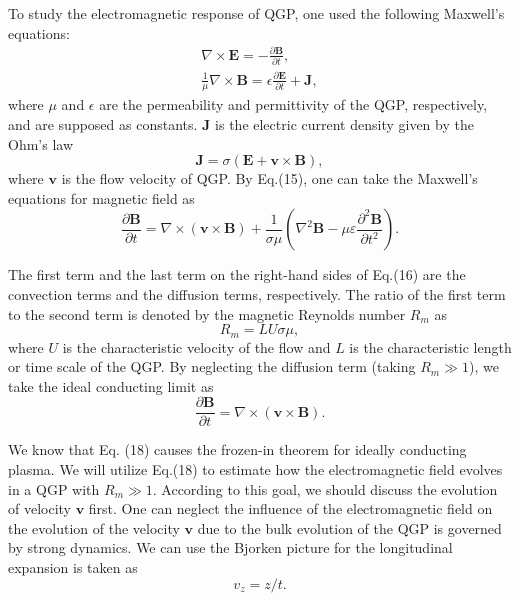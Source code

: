 \documentclass[twocolumn,showpacs,preprintnumbers,amsmath,amssymb]{revtex4}
\begin{document}
To study  the electromagnetic response of
QGP, one used the following Maxwell's equations:
\begin{eqnarray}
\nabla\times\textbf{E} =-\frac{\partial\textbf{B}}{\partial t}, \label{eq:eq13} \\ %
\frac{1}{\mu}\nabla\times\textbf{B} = \epsilon\frac{\partial\textbf{E}}{\partial t} + \textbf{J}, \label{eq:eq14} %
\end{eqnarray}
where $\mu$ and $\epsilon$ are the permeability and permittivity of the QGP,
respectively, and are supposed as constants. $\textbf{J}$ is the electric
current density given by the Ohm's law
\begin{equation}
\textbf{J}=\sigma(\textbf{E}+\textbf{v}\times\textbf{B}),
\label{eq:eq15} %
\end{equation}
where $\textbf{v}$ is the flow velocity of QGP.  By Eq.(15), one can take
the Maxwell's equations for magnetic field as
\begin{equation}
\frac{\partial\textbf{B}}{\partial t}=\nabla\times(\textbf{v}\times\textbf{B})+\frac{1}
{\sigma\mu}(\nabla^{2}\textbf{B}-\mu\varepsilon\frac{\partial^{2}\textbf{B}}{\partial t^{2}}).
\label{eq:eq16} %
\end{equation}

The first term and the last term on the right-hand sides of Eq.(16) are the convection terms and  the
diffusion terms, respectively. The ratio of the first term to the second term is denoted by the magnetic Reynolds number $R_{m}$ as
\begin{equation}
R_{m}=LU\sigma\mu,
\label{eq:eq17} %
\end{equation}
where $U$ is the characteristic velocity of the flow and $L$ is the characteristic length or time scale of the QGP.
By neglecting the diffusion term (taking $R_{m}\gg1$), we take the ideal conducting limit as
\begin{equation}
\frac{\partial\textbf{B}}{\partial t}=\nabla\times (\textbf{v}\times\textbf{B}).
\label{eq:eq18} %
\end{equation}

We know that Eq. (18) causes the frozen-in theorem
for ideally conducting plasma. We will utilize Eq.(18) to estimate how the electromagnetic
field evolves in a QGP with $R_{m}\gg1$. According to this goal, we should discuss the evolution of velocity $\textbf{v}$ first.
One can neglect the influence of the electromagnetic field on
the evolution of the velocity $\textbf{v}$ due to the bulk evolution of the QGP is governed by strong dynamics.
We can use the Bjorken picture for the longitudinal expansion is taken as~\cite{lab27,lab28}
\begin{equation}
v_{z}=z/t.
\label{eq:eq19} %
\end{equation}
\end{document}
